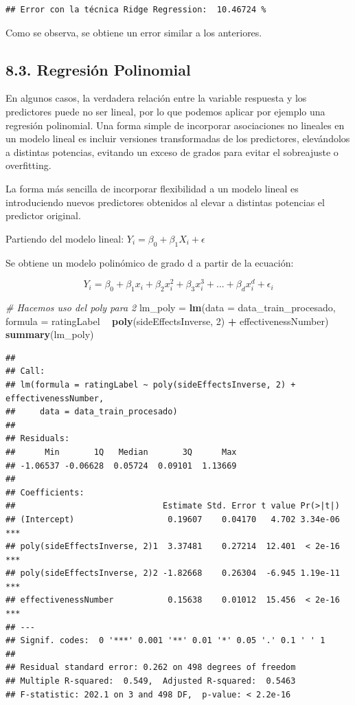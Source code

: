 \documentclass[spanish,]{article}
\newenvironment{Shaded}{\begin{snugshade}}{\end{snugshade}}
\newcommand{\KeywordTok}[1]{\textcolor[rgb]{0.13,0.29,0.53}{\textbf{#1}}}
\newcommand{\DataTypeTok}[1]{\textcolor[rgb]{0.13,0.29,0.53}{#1}}
\newcommand{\DecValTok}[1]{\textcolor[rgb]{0.00,0.00,0.81}{#1}}
\newcommand{\StringTok}[1]{\textcolor[rgb]{0.31,0.60,0.02}{#1}}
\newcommand{\CommentTok}[1]{\textcolor[rgb]{0.56,0.35,0.01}{\textit{#1}}}
\newcommand{\OperatorTok}[1]{\textcolor[rgb]{0.81,0.36,0.00}{\textbf{#1}}}
\newcommand{\NormalTok}[1]{#1}
\begin{document}
\begin{verbatim}
## Error con la técnica Ridge Regression:  10.46724 %
\end{verbatim}

Como se observa, se obtiene un error similar a los anteriores.

\subsection{8.3. Regresión Polinomial}\label{regresion-polinomial}

En algunos casos, la verdadera relación entre la variable respuesta y
los predictores puede no ser lineal, por lo que podemos aplicar por
ejemplo una regresión polinomial. Una forma simple de incorporar
asociaciones no lineales en un modelo lineal es incluir versiones
transformadas de los predictores, elevándolos a distintas potencias,
evitando un exceso de grados para evitar el sobreajuste o overfitting.

La forma más sencilla de incorporar flexibilidad a un modelo lineal es
introduciendo nuevos predictores obtenidos al elevar a distintas
potencias el predictor original.

Partiendo del modelo lineal: \(Y_i = \beta_0 + \beta_1 X_i + \epsilon\)

Se obtiene un modelo polinómico de grado d a partir de la ecuación:

\[Y_i = \beta_0 + \beta_1 x_i + \beta_2 x^2_i + \beta_3 x^3_i + ... + \beta_d x^d_i + \epsilon_i\]

\begin{Shaded}
\begin{Highlighting}[]
\CommentTok{# Hacemos uso del poly para 2}
\NormalTok{lm_poly =}\StringTok{ }\KeywordTok{lm}\NormalTok{(}\DataTypeTok{data =}\NormalTok{ data_train_procesado, }
    \DataTypeTok{formula =}\NormalTok{ ratingLabel }\OperatorTok{~}\StringTok{ }\KeywordTok{poly}\NormalTok{(sideEffectsInverse, }\DecValTok{2}\NormalTok{) }\OperatorTok{+}\StringTok{ }\NormalTok{effectivenessNumber)}
\KeywordTok{summary}\NormalTok{(lm_poly)}
\end{Highlighting}
\end{Shaded}

\begin{verbatim}
## 
## Call:
## lm(formula = ratingLabel ~ poly(sideEffectsInverse, 2) + effectivenessNumber, 
##     data = data_train_procesado)
## 
## Residuals:
##      Min       1Q   Median       3Q      Max 
## -1.06537 -0.06628  0.05724  0.09101  1.13669 
## 
## Coefficients:
##                              Estimate Std. Error t value Pr(>|t|)    
## (Intercept)                   0.19607    0.04170   4.702 3.34e-06 ***
## poly(sideEffectsInverse, 2)1  3.37481    0.27214  12.401  < 2e-16 ***
## poly(sideEffectsInverse, 2)2 -1.82668    0.26304  -6.945 1.19e-11 ***
## effectivenessNumber           0.15638    0.01012  15.456  < 2e-16 ***
## ---
## Signif. codes:  0 '***' 0.001 '**' 0.01 '*' 0.05 '.' 0.1 ' ' 1
## 
## Residual standard error: 0.262 on 498 degrees of freedom
## Multiple R-squared:  0.549,  Adjusted R-squared:  0.5463 
## F-statistic: 202.1 on 3 and 498 DF,  p-value: < 2.2e-16
\end{verbatim}
\end{document}
